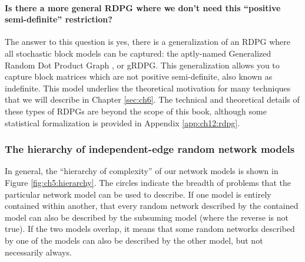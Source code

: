 \paragraph{Is there a more general RDPG where we don't need this ``positive semi-definite'' restriction?}
\label{sec:ch5:ier:grdpg}
The answer to this question is yes, there is a generalization of an RDPG where all stochastic block models can be captured: the aptly-named Generalized Random Dot Product Graph \cite{Rubin2022Sep}, or gRDPG. This generalization allows you to capture block matrices which are not positive semi-definite, also known as indefinite. This model underlies the theoretical motivation for many techniques that we will describe in Chapter \ref{sec:ch6}. The technical and theoretical details of these types of RDPGs are beyond the scope of this book, although some statistical formalization is provided in Appendix \ref{app:ch12:rdpg}.

\subsubsection{The hierarchy of independent-edge random network models}

In general, the ``hierarchy of complexity'' of our network models is shown in Figure \ref{fig:ch5:hierarchy}. The circles indicate the breadth of problems that the particular network model can be used to describe. If one model is entirely contained within another, that every random network described by the contained model can also be described by the subsuming model (where the reverse is not true). If the two models overlap, it means that some random networks described by one of the models can also be described by the other model, but not necessarily always.

